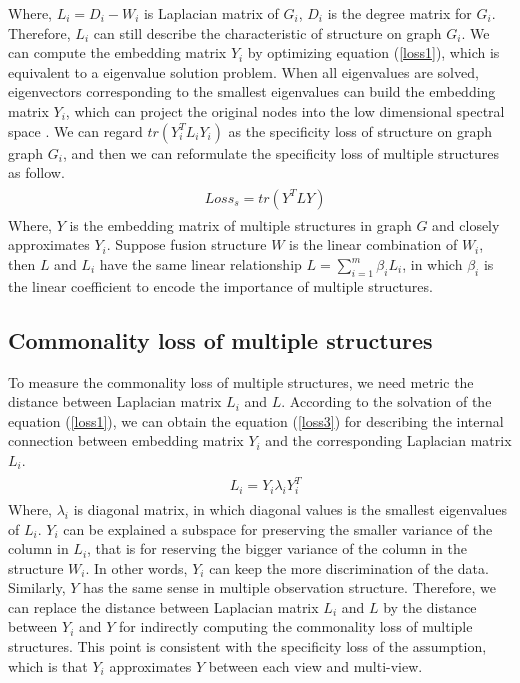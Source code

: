 \documentclass[review]{elsarticle}
\begin{document}
Where, $L_{i}=D_{i}-W_{i}$ is Laplacian matrix of $G_{i}$, $D_{i}$ is the degree matrix for $G_{i}$. Therefore, $L_{i}$ can still describe the characteristic of structure on graph $G_{i}$. We can compute the embedding matrix $Y_{i}$ by optimizing equation (\ref{loss1}), which is equivalent to a eigenvalue solution problem. When all eigenvalues are solved, eigenvectors corresponding to the smallest eigenvalues can build the embedding matrix $Y_{i}$, which can project the original nodes into the low dimensional spectral space \cite{xia2010multiview}. We can regard $tr(Y_{i}^{T}L_{i}Y_{i})$ as the specificity loss of structure on graph graph $G_{i}$, and then we can reformulate the specificity loss of multiple structures as follow.
\begin{align}
\label{loss2}
\begin{aligned}
&Loss_{s}=tr(Y^{T}LY)
\end{aligned}
\end{align}
Where, $Y$ is the embedding matrix of multiple structures in graph $G$ and closely approximates $Y_{i}$. Suppose fusion structure $W$ is the linear combination of $W_{i}$, then $L$ and $L_{i}$ have the same linear relationship $L=\sum_{i=1}^{m}\beta_{i}L_{i}$, in which $\beta_{i}$ is the linear coefficient to encode the importance of multiple structures.

\subsection{Commonality loss of multiple structures}
\label{commonality}
To measure the commonality loss of multiple structures, we need metric the distance between Laplacian matrix $L_{i}$ and $L$.  According to the solvation of the equation (\ref{loss1}), we can obtain the equation (\ref{loss3}) for describing the internal connection between embedding matrix $Y_{i}$ and the corresponding Laplacian matrix $L_{i}$.
\begin{align}
\label{loss3}
\begin{aligned}
&L_{i}=Y_{i}\lambda_{i} Y_{i}^{T}
\end{aligned}
\end{align}
Where, $\lambda_{i}$ is diagonal matrix, in which diagonal values is the smallest eigenvalues of $L_{i}$. $Y_{i}$ can be explained a subspace for preserving the smaller variance of the column in $L_{i}$, that is for reserving the bigger variance of the column in the structure $W_{i}$. In other words, $Y_{i}$ can keep the more discrimination of the data. Similarly, $Y$ has the same sense in multiple observation structure. Therefore, we can replace the distance between Laplacian matrix $L_{i}$ and $L$ by the distance between $Y_{i}$ and $Y$ for indirectly computing the commonality loss of multiple structures. This point is consistent with  the specificity loss of the assumption, which is that $Y_{i}$ approximates $Y$ between each view and multi-view.
\end{document}
